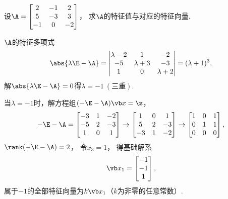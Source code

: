 \begin{example}
设\(\A = \begin{bmatrix} 2 & -1 & 2 \\ 5 & -3 & 3 \\ -1 & 0 & -2 \end{bmatrix}\)，
求\(\A\)的特征值与对应的特征向量.
\begin{solution}
\(\A\)的特征多项式\[
	\abs{\lambda\E-\A}
	= \begin{vmatrix}
		\lambda-2 & 1 & -2 \\
		-5 & \lambda+3 & -3 \\
		1 & 0 & \lambda+2
	\end{vmatrix}
	= (\lambda+1)^3,
\]
解\(\abs{\lambda\E-\A}=0\)得\(\lambda=-1\ (\text{三重})\).

当\(\lambda=-1\)时，解方程组\((-\E-\A)\x=\z\)，\[
	-\E-\A = \begin{bmatrix} -3 & 1 & -2 \\ -5 & 2 & -3 \\ 1 & 0 & 1 \end{bmatrix}
	\to \begin{bmatrix} 1 & 0 & 1 \\ 5 & 2 & -3 \\ -3 & 1 & -2 \end{bmatrix}
	\to \begin{bmatrix} 1 & 0 & 1 \\ 0 & 1 & 1 \\ 0 & 0 & 0 \end{bmatrix},
\]
\(\rank(-\E-\A)=2\)，
令\(x_3=1\)，
得基础解系\[
	\x_1=\begin{bmatrix} -1 \\ -1 \\ 1 \end{bmatrix},
\]
属于\(-1\)的全部特征向量为\(k\x_1\)（\(k\)为非零的任意常数）.
\end{solution}
\end{example}

